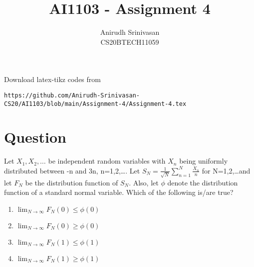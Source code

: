 \documentclass[journal,12pt,twocolumn]{IEEEtran}
\begin{document}
\let\StandardTheFigure\thefigure
\let\vec\mathbf
\renewcommand{\thefigure}{\theproblem}
\def\putbox#1#2#3{\makebox[0in][l]{\makebox[#1][l]{}\raisebox{\baselineskip}[0in][0in]{\raisebox{#2}[0in][0in]{#3}}}}
     \def\rightbox#1{\makebox[0in][r]{#1}}
     \def\centbox#1{\makebox[0in]{#1}}
     \def\topbox#1{\raisebox{-\baselineskip}[0in][0in]{#1}}
     \def\midbox#1{\raisebox{-0.5\baselineskip}[0in][0in]{#1}}
\vspace{3cm}
\title{AI1103 - Assignment 4}
\author{Anirudh Srinivasan\\CS20BTECH11059}
\maketitle
\newpage
\bigskip
\renewcommand{\thefigure}{\theenumi}
\renewcommand{\thetable}{\theenumi}
Download latex-tikz codes from 
%
\begin{lstlisting}
https://github.com/Anirudh-Srinivasan-CS20/AI1103/blob/main/Assignment-4/Assignment-4.tex
\end{lstlisting}
\section*{Question}
Let $X_1,X_2,\dots$ be independent random variables with $X_n$ being uniformly distributed between -n and 3n, n=1,2,\dots. 
Let $S_N = \frac{1}{\sqrt{N}} \sum_{n=1}^N \frac{X_n}{n}$ for N=1,2,\dots and let $F_N$ be the distribution function of $S_N$. Also, let $\phi$ denote the distribution function of a standard normal variable. Which of the following is/are true? 
\begin{enumerate}[label=\Alph*)]
    \item $\lim_{N\to\infty} F_N(0)\leq \phi(0)$
    \item $\lim_{N\to\infty} F_N(0)\geq \phi(0)$
    \item $\lim_{N\to\infty} F_N(1)\leq \phi(1)$
    \item $\lim_{N\to\infty} F_N(1)\geq \phi(1)$
\end{enumerate}
\end{document}
